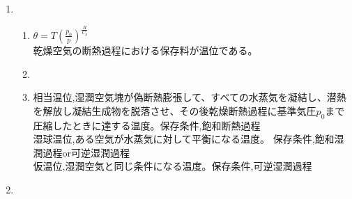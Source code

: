 \documentclass{jsarticle}
\newenvironment{problems}
{
  \renewcommand\labelenumi{\doublebox{\arabic{enumi}}}
  \begin{enumerate}
}{
  \end{enumerate}
  \renewcommand\labelenumi{\arabic{enumi}.}
}
\begin{document}
\begin{problems}
\begin{enumerate}[(1)]
  \item
  $P = \frac{nRT}{V}$ 乾燥気体の状態方程式を変形

  \end{enumerate}

\item 
	\begin{enumerate}[(1)]
  \item $\theta = T\left(\frac{p_0}{p}\right)^{\frac{R}{C_p}}$\\
  乾燥空気の断熱過程における保存料が温位である。
  \item
  \item
  相当温位,湿潤空気塊が偽断熱膨張して、すべての水蒸気を凝結し、潜熱を解放し凝結生成物を脱落させ、その後乾燥断熱過程に基準気圧$p_0$まで圧縮したときに達する温度。保存条件,飽和断熱過程\\
  湿球温位,ある空気が水蒸気に対して平衡になる温度。 保存条件,飽和湿潤過程or可逆湿潤過程\\
  仮温位,湿潤空気と同じ条件になる温度。保存条件,可逆湿潤過程
\end{enumerate}
\item 
\end{problems}
\end{document}
